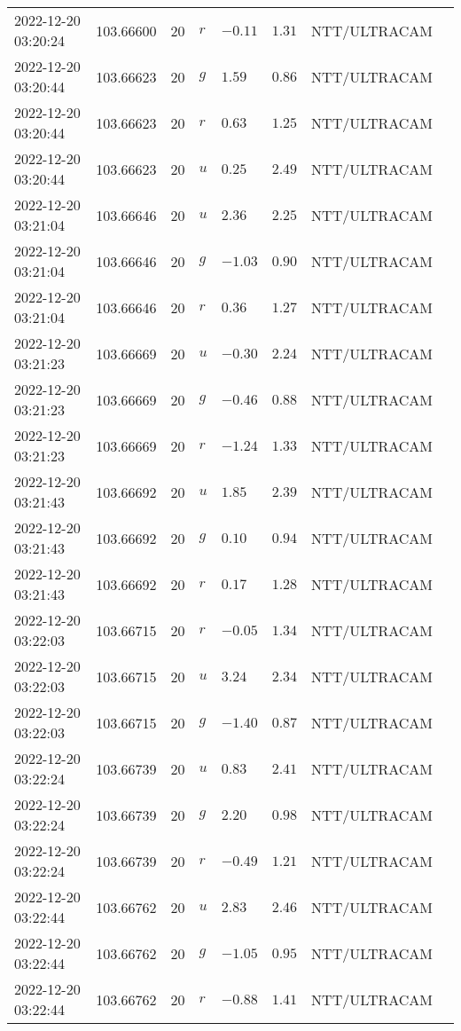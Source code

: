 \documentclass{nature_plusfigure}
\begin{document}
\begin{supplement}
\begin{center}
\begin{longtable}{llllllll}
2022-12-20 03:20:24 & 103.66600 & 20 & $r$ & $-0.11$ & $1.31$ & NTT/ULTRACAM &  \\ 
2022-12-20 03:20:44 & 103.66623 & 20 & $g$ & $1.59$ & $0.86$ & NTT/ULTRACAM &  \\ 
2022-12-20 03:20:44 & 103.66623 & 20 & $r$ & $0.63$ & $1.25$ & NTT/ULTRACAM &  \\ 
2022-12-20 03:20:44 & 103.66623 & 20 & $u$ & $0.25$ & $2.49$ & NTT/ULTRACAM &  \\ 
2022-12-20 03:21:04 & 103.66646 & 20 & $u$ & $2.36$ & $2.25$ & NTT/ULTRACAM &  \\ 
2022-12-20 03:21:04 & 103.66646 & 20 & $g$ & $-1.03$ & $0.90$ & NTT/ULTRACAM &  \\ 
2022-12-20 03:21:04 & 103.66646 & 20 & $r$ & $0.36$ & $1.27$ & NTT/ULTRACAM &  \\ 
2022-12-20 03:21:23 & 103.66669 & 20 & $u$ & $-0.30$ & $2.24$ & NTT/ULTRACAM &  \\ 
2022-12-20 03:21:23 & 103.66669 & 20 & $g$ & $-0.46$ & $0.88$ & NTT/ULTRACAM &  \\ 
2022-12-20 03:21:23 & 103.66669 & 20 & $r$ & $-1.24$ & $1.33$ & NTT/ULTRACAM &  \\ 
2022-12-20 03:21:43 & 103.66692 & 20 & $u$ & $1.85$ & $2.39$ & NTT/ULTRACAM &  \\ 
2022-12-20 03:21:43 & 103.66692 & 20 & $g$ & $0.10$ & $0.94$ & NTT/ULTRACAM &  \\ 
2022-12-20 03:21:43 & 103.66692 & 20 & $r$ & $0.17$ & $1.28$ & NTT/ULTRACAM &  \\ 
2022-12-20 03:22:03 & 103.66715 & 20 & $r$ & $-0.05$ & $1.34$ & NTT/ULTRACAM &  \\ 
2022-12-20 03:22:03 & 103.66715 & 20 & $u$ & $3.24$ & $2.34$ & NTT/ULTRACAM &  \\ 
2022-12-20 03:22:03 & 103.66715 & 20 & $g$ & $-1.40$ & $0.87$ & NTT/ULTRACAM &  \\ 
2022-12-20 03:22:24 & 103.66739 & 20 & $u$ & $0.83$ & $2.41$ & NTT/ULTRACAM &  \\ 
2022-12-20 03:22:24 & 103.66739 & 20 & $g$ & $2.20$ & $0.98$ & NTT/ULTRACAM &  \\ 
2022-12-20 03:22:24 & 103.66739 & 20 & $r$ & $-0.49$ & $1.21$ & NTT/ULTRACAM &  \\ 
2022-12-20 03:22:44 & 103.66762 & 20 & $u$ & $2.83$ & $2.46$ & NTT/ULTRACAM &  \\ 
2022-12-20 03:22:44 & 103.66762 & 20 & $g$ & $-1.05$ & $0.95$ & NTT/ULTRACAM &  \\ 
2022-12-20 03:22:44 & 103.66762 & 20 & $r$ & $-0.88$ & $1.41$ & NTT/ULTRACAM &  \\ 

\end{longtable}
\end{center}
\end{supplement}
\end{document}
